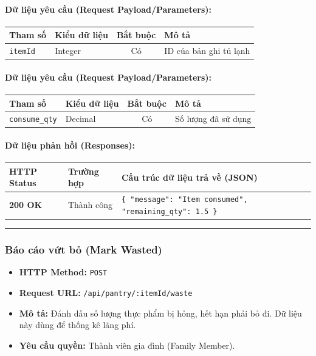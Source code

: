 \documentclass[12pt,a4paper]{article}
\begin{document}
\paragraph{Dữ liệu yêu cầu (Request Payload/Parameters):}
\begin{longtable}{|>{\raggedright\arraybackslash}p{2.8cm}|>{\raggedright\arraybackslash}p{2.2cm}|c|>{\raggedright\arraybackslash}p{7.0cm}|}
\hline
\textbf{Tham số} & \textbf{Kiểu dữ liệu} & \textbf{Bắt buộc} & \textbf{Mô tả} \\ \hline
\endhead
\texttt{itemId} & Integer & Có & ID của bản ghi tủ lạnh \\ \hline
\end{longtable}

\paragraph{Dữ liệu yêu cầu (Request Payload/Parameters):}
\begin{longtable}{|>{\raggedright\arraybackslash}p{2.8cm}|>{\raggedright\arraybackslash}p{2.2cm}|c|>{\raggedright\arraybackslash}p{7.0cm}|}
\hline
\textbf{Tham số} & \textbf{Kiểu dữ liệu} & \textbf{Bắt buộc} & \textbf{Mô tả} \\ \hline
\endhead
\texttt{consume\_qty} & Decimal & Có & Số lượng đã sử dụng \\ \hline
\end{longtable}

\paragraph{Dữ liệu phản hồi (Responses):}
\begin{longtable}{|>{\raggedright\arraybackslash}p{2.8cm}|>{\raggedright\arraybackslash}p{3.2cm}|>{\raggedright\arraybackslash}p{8.0cm}|}
\hline
\textbf{HTTP Status} & \textbf{Trường hợp} & \textbf{Cấu trúc dữ liệu trả về (JSON)} \\ \hline
\endhead
\textbf{200 OK} & Thành công & \texttt{\{ "message": "Item consumed", "remaining\_qty": 1.5 \}} \\ \hline
\end{longtable}

\vskip 0.4cm
\noindent\rule{\textwidth}{0.3pt}
\vskip 0.4cm

\subsubsection{Báo cáo vứt bỏ (Mark Wasted)}
\begin{itemize}[leftmargin=*]
    \item \textbf{HTTP Method:} \texttt{POST}
    \item \textbf{Request URL:} \texttt{/api/pantry/:itemId/waste}
    \item \textbf{Mô tả:} Đánh dấu số lượng thực phẩm bị hỏng, hết hạn phải bỏ đi. Dữ liệu này dùng để thống kê lãng phí.
    \item \textbf{Yêu cầu quyền:} Thành viên gia đình (Family Member).
\end{itemize}
\end{document}
